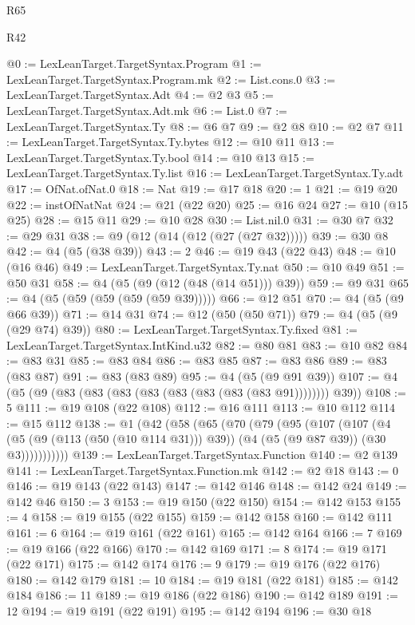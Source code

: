 \begin{lexlean}{R65}
\begin{lexlean}{R42}
\begin{coremodule}
{{{{{{{{{{{{{{{{{{{{{{{{{{{{{{{{{{{{{{{{{{{{{{{{{{{{{{{{{{{{{{{{{{{{{{{{{{{{{{{{{{{{{{{{{{{{{{{{{{{{{{{{{{{{{{{{{{{{{{{{{{{{{{{{{{{{{{{{{{{{{{{{{{{{{{{{{{{{{{{{{{{{{{{{{{{{{{{{{{{{{{{@0 := LexLeanTarget.TargetSyntax.Program
@1 := LexLeanTarget.TargetSyntax.Program.mk
@2 := List.cons.{0}
@3 := LexLeanTarget.TargetSyntax.Adt
@4 := @2 @3
@5 := LexLeanTarget.TargetSyntax.Adt.mk
@6 := List.{0}
@7 := LexLeanTarget.TargetSyntax.Ty
@8 := @6 @7
@9 := @2 @8
@10 := @2 @7
@11 := LexLeanTarget.TargetSyntax.Ty.bytes
@12 := @10 @11
@13 := LexLeanTarget.TargetSyntax.Ty.bool
@14 := @10 @13
@15 := LexLeanTarget.TargetSyntax.Ty.list
@16 := LexLeanTarget.TargetSyntax.Ty.adt
@17 := OfNat.ofNat.{0}
@18 := Nat
@19 := @17 @18
@20 := 1
@21 := @19 @20
@22 := instOfNatNat
@24 := @21 (@22 @20)
@25 := @16 @24
@27 := @10 (@15 @25)
@28 := @15 @11
@29 := @10 @28
@30 := List.nil.{0}
@31 := @30 @7
@32 := @29 @31
@38 := @9 (@12 (@14 (@12 (@27 (@27 @32)))))
@39 := @30 @8
@42 := @4 (@5 (@38 @39))
@43 := 2
@46 := @19 @43 (@22 @43)
@48 := @10 (@16 @46)
@49 := LexLeanTarget.TargetSyntax.Ty.nat
@50 := @10 @49
@51 := @50 @31
@58 := @4 (@5 (@9 (@12 (@48 (@14 @51))) @39))
@59 := @9 @31
@65 := @4 (@5 (@59 (@59 (@59 (@59 @39)))))
@66 := @12 @51
@70 := @4 (@5 (@9 @66 @39))
@71 := @14 @31
@74 := @12 (@50 (@50 @71))
@79 := @4 (@5 (@9 (@29 @74) @39))
@80 := LexLeanTarget.TargetSyntax.Ty.fixed
@81 := LexLeanTarget.TargetSyntax.IntKind.u32
@82 := @80 @81
@83 := @10 @82
@84 := @83 @31
@85 := @83 @84
@86 := @83 @85
@87 := @83 @86
@89 := @83 (@83 @87)
@91 := @83 (@83 @89)
@95 := @4 (@5 (@9 @91 @39))
@107 := @4 (@5 (@9 (@83 (@83 (@83 (@83 (@83 (@83 (@83 (@83 @91)))))))) @39))
@108 := 5
@111 := @19 @108 (@22 @108)
@112 := @16 @111
@113 := @10 @112
@114 := @15 @112
@138 := @1
    (@42
      (@58
        (@65
          (@70
            (@79
              (@95
                (@107
                  (@107
                    (@4
                      (@5 (@9 (@113 (@50 (@10 @114 @31))) @39))
                      (@4 (@5 (@9 @87 @39)) (@30 @3)))))))))))
@139 := LexLeanTarget.TargetSyntax.Function
@140 := @2 @139
@141 := LexLeanTarget.TargetSyntax.Function.mk
@142 := @2 @18
@143 := 0
@146 := @19 @143 (@22 @143)
@147 := @142 @146
@148 := @142 @24
@149 := @142 @46
@150 := 3
@153 := @19 @150 (@22 @150)
@154 := @142 @153
@155 := 4
@158 := @19 @155 (@22 @155)
@159 := @142 @158
@160 := @142 @111
@161 := 6
@164 := @19 @161 (@22 @161)
@165 := @142 @164
@166 := 7
@169 := @19 @166 (@22 @166)
@170 := @142 @169
@171 := 8
@174 := @19 @171 (@22 @171)
@175 := @142 @174
@176 := 9
@179 := @19 @176 (@22 @176)
@180 := @142 @179
@181 := 10
@184 := @19 @181 (@22 @181)
@185 := @142 @184
@186 := 11
@189 := @19 @186 (@22 @186)
@190 := @142 @189
@191 := 12
@194 := @19 @191 (@22 @191)
@195 := @142 @194
@196 := @30 @18
}}}}}}}}}}}}}}}}}}}}}}}}}}}}}}}}}}}}}}}}}}}}}}}}}}}}}}}}}}}}}}}}}}}}}}}}}}}}}}}}}}}}}}}}}}}}}}}}}}}}}}}}}}}}}}}}}}}}}}}}}}}}}}}}}}}}}}}}}}}}}}}}}}}}}}}}}}}}}}}}}}}}}}}}}}}}}}}}}}}}}}}
\end{coremodule}
\end{lexlean}
\end{lexlean}
